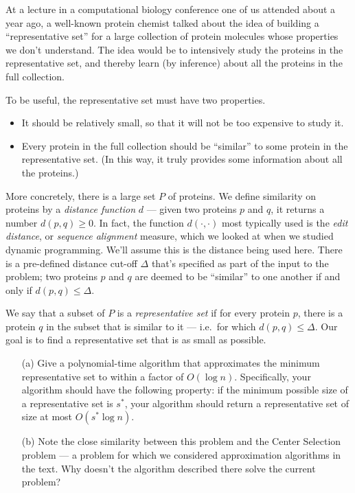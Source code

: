 \documentclass[12pt]{article}
\begin{document}
\begin{enumerate}
At a lecture in a computational biology conference
one of us attended about a year ago, a well-known protein chemist
talked about the idea of building a ``representative set'' for
a large collection of protein molecules whose properties we
don't understand.
The idea would be to intensively study the proteins in
the representative set, and thereby learn (by inference) about all the proteins
in the full collection.

To be useful, the representative set must have two properties.
\begin{itemize}
\item It should be relatively small, so
that it will not be too expensive to study it.
\item Every protein in the full collection
should be ``similar'' to some protein in the representative set.
(In this way, it truly provides some information about
all the proteins.)
\end{itemize}

More concretely, there is a large set $P$ of proteins.
We define similarity on proteins by a
{\em distance function} $d$ --- given two proteins
$p$ and $q$, it returns a number $d(p,q) \geq 0$.
In fact, the function $d(\cdot,\cdot)$ most typically
used is the {\em edit distance}, or {\em sequence alignment} measure,
which we looked at when we studied dynamic programming.
We'll assume this is the distance being used here.
There is a pre-defined distance cut-off $\Delta$ that's
specified as part of the input to the problem;
two proteins $p$ and $q$
are deemed to be ``similar'' to one another if and only if
$d(p,q) \leq \Delta$.

We say that a subset of $P$ is a {\em representative set}
if for every protein $p$, there is a protein $q$
in the subset that is similar to it ---
i.e.~for which $d(p,q) \leq \Delta$.
Our goal is to find a representative set that is as small
as possible.

\begin{itemize}
\item[(a)]
Give a polynomial-time algorithm that approximates
the minimum representative set to within a factor of $O(\log n)$.
Specifically, your algorithm should have the
following property:
if the minimum possible size of a representative
set is $s^*$, your algorithm should return a
representative set of size at most $O(s^* \log n)$.
\item[(b)] Note the close similarity between this problem
and the Center Selection problem --- a problem for which we considered
approximation algorithms in the text.
Why doesn't the algorithm described there solve the current problem?
\end{itemize}






\end{enumerate}
\end{document}

